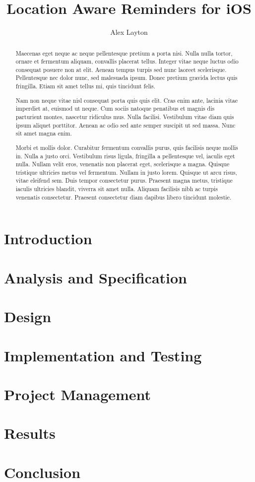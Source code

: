 \documentclass{bhamthesis}
\author{Alex Layton}
\title{Location Aware Reminders for iOS}
\begin{document}
\maketitle

\begin{abstract}

Maecenas eget neque ac neque pellentesque pretium a porta nisi. Nulla nulla tortor, ornare et fermentum aliquam, convallis placerat tellus. Integer vitae neque luctus odio consequat posuere non at elit. Aenean tempus turpis sed nunc laoreet scelerisque. Pellentesque nec dolor nunc, sed malesuada ipsum. Donec pretium gravida lectus quis fringilla. Etiam sit amet tellus mi, quis tincidunt felis.

Nam non neque vitae nisl consequat porta quis quis elit. Cras enim ante, lacinia vitae imperdiet at, euismod ut neque. Cum sociis natoque penatibus et magnis dis parturient montes, nascetur ridiculus mus. Nulla facilisi. Vestibulum vitae diam quis ipsum aliquet porttitor. Aenean ac odio sed ante semper suscipit ut sed massa. Nunc sit amet magna enim.

Morbi et mollis dolor. Curabitur fermentum convallis purus, quis facilisis neque mollis in. Nulla a justo orci. Vestibulum risus ligula, fringilla a pellentesque vel, iaculis eget nulla. Nullam velit eros, venenatis non placerat eget, scelerisque a magna. Quisque tristique ultricies metus vel fermentum. Nullam in justo lorem. Quisque ut arcu risus, vitae eleifend sem. Duis tempor consectetur purus. Praesent magna metus, tristique iaculis ultricies blandit, viverra sit amet nulla. Aliquam facilisis nibh ac turpis venenatis consectetur. Praesent consectetur diam dapibus libero tincidunt molestie.

\end{abstract}

\section*{Introduction}

\section*{Analysis and Specification}

\section*{Design}

\section*{Implementation and Testing}

\section*{Project Management}

\section*{Results}

\section*{Conclusion}
\end{document}
